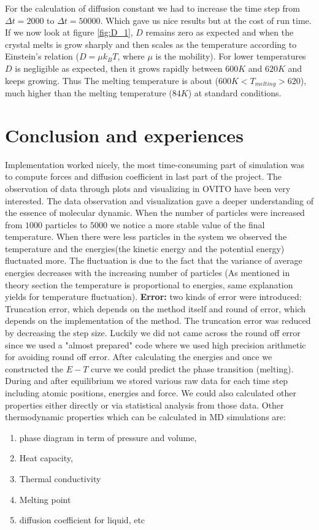 \documentclass[a4paper]{article}
\begin{document}
For the calculation of diffusion constant we had to increase the time step from $\Delta t = 2000$ to $ \Delta t = 50000$. Which gave us nice results but at the cost of run time. 
If we now look at figure \ref{fig:D_1}, $D$ remains zero as expected and when the crystal melts is grow sharply and then scales as the temperature according to Einstein's relation ($D = \mu k_B T$, where $\mu$ is the mobility). For lower temperatures $D$ is negligible as expected, then it grows rapidly between $600K$ and $620K$ and keeps growing. Thus The melting temperature is about ($600K < T_{melting} > 620$), much higher than the melting temperature ($84K$) at standard conditions.  

\newpage
\section{Conclusion and experiences}
Implementation worked nicely, the most time-consuming part of simulation was to compute forces and diffusion coefficient in last part of the project. The observation of data through plots and visualizing in OVITO have been very interested. The data observation and visualization gave a deeper understanding of the essence of molecular dynamic. When the number of particles were increased from $1000$ particles to $5000$ we notice a more stable value of the final temperature. When there were less particles in the system we observed the temperature and the energies(the kinetic energy and the potential energy) fluctuated more. The fluctuation is due to the fact that the variance of average energies decreases with the increasing number of particles (As mentioned in theory section the temperature is proportional to energies, same explanation yields for temperature fluctuation). \textbf{Error:} two kinds of error were introduced: Truncation error, which depends on the method itself and round of error, which depends on the implementation of the method. The truncation error was reduced by decreasing the step size. Luckily we did not came across the round off error since we used a "almost prepared" code where we used high precision arithmetic for avoiding round off error. After calculating the energies and once we constructed the $E-T$ curve we could predict the phase transition (melting). During and after equilibrium we stored various raw data for each time step including atomic positions, energies and force. We could also calculated other properties either directly or via statistical analysis from those data. Other thermodynamic properties which can be calculated in MD simulations are:
\begin{enumerate}
\item phase diagram in term of pressure and volume, 
\item Heat capacity, 
\item Thermal conductivity
\item Melting point
\item diffusion coefficient for liquid, etc
\end{enumerate}
\end{document}
